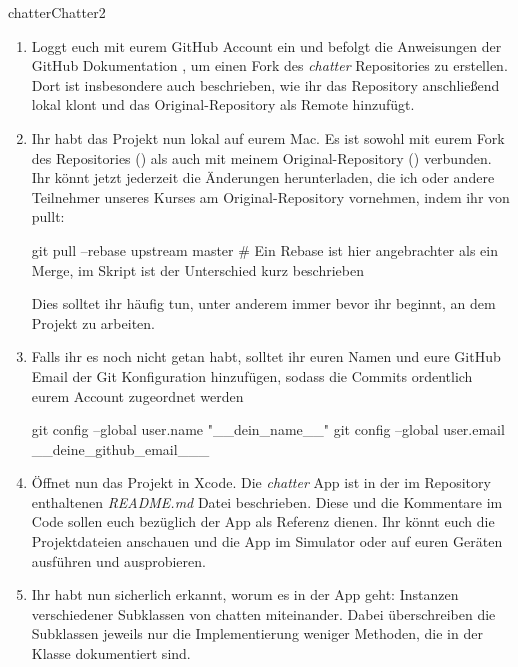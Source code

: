 \documentclass[parskip=half, final]{scrreprt}
\begin{document}
\begin{lecture}
\begin{exc}
\begin{excitem}{chatter}{Chatter}{2}
\begin{enumerate}[label=\roman*.]
\item Loggt euch mit eurem GitHub Account ein und befolgt die Anweisungen der GitHub Dokumentation , um einen Fork des \emph{chatter} Repositories  zu erstellen. Dort ist insbesondere auch beschrieben, wie ihr das Repository anschließend lokal klont und das Original-Repository als Remote  hinzufügt.

\item Ihr habt das Projekt nun lokal auf eurem Mac. Es ist sowohl mit eurem Fork des Repositories () als auch mit meinem Original-Repository () verbunden. Ihr könnt jetzt jederzeit die Änderungen herunterladen, die ich oder andere Teilnehmer unseres Kurses am Original-Repository vornehmen, indem ihr von  pullt:

\begin{shcode}
git pull --rebase upstream master # Ein Rebase ist hier angebrachter als ein Merge, im Skript ist der Unterschied kurz beschrieben
\end{shcode}

Dies solltet ihr häufig tun, unter anderem immer bevor ihr beginnt, an dem Projekt zu arbeiten.

\item Falls ihr es noch nicht getan habt, solltet ihr euren Namen und eure GitHub Email der Git Konfiguration hinzufügen, sodass die Commits ordentlich eurem Account zugeordnet werden

\begin{shcode}
git config --global user.name "__dein_name__"
git config --global user.email __deine_github_email___
\end{shcode}

\item Öffnet nun das Projekt in Xcode. Die \emph{chatter} App ist in der im Repository enthaltenen \emph{README.md} Datei beschrieben. Diese und die Kommentare im Code sollen euch bezüglich der App als Referenz dienen. Ihr könnt euch die Projektdateien anschauen und die App im Simulator oder auf euren Geräten ausführen und ausprobieren.

\item Ihr habt nun sicherlich erkannt, worum es in der App geht: Instanzen verschiedener Subklassen von  chatten miteinander. Dabei überschreiben die Subklassen jeweils nur die Implementierung weniger Methoden, die in der  Klasse dokumentiert sind.


\end{enumerate}
\end{excitem}
\end{exc}
\end{lecture}
\end{document}
